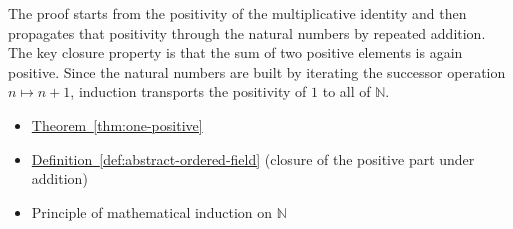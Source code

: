 \begin{remark*}
The proof starts from the positivity of the multiplicative identity and then
propagates that positivity through the natural numbers by repeated addition.
The key closure property is that the sum of two positive elements is again
positive.  Since the natural numbers are built by iterating the successor
operation $n\mapsto n+1$, induction transports the positivity of $1$ to all
of $\mathbb{N}$.
\end{remark*}

\begin{dependencies}
\begin{itemize}
  \item \hyperref[thm:one-positive]{Theorem~\ref*{thm:one-positive}}
  \item \hyperref[def:abstract-ordered-field]{Definition~\ref*{def:abstract-ordered-field}}
        \textnormal{(closure of the positive part under addition)}
  \item Principle of mathematical induction on $\mathbb{N}$
\end{itemize}
\end{dependencies}

\clearpage
